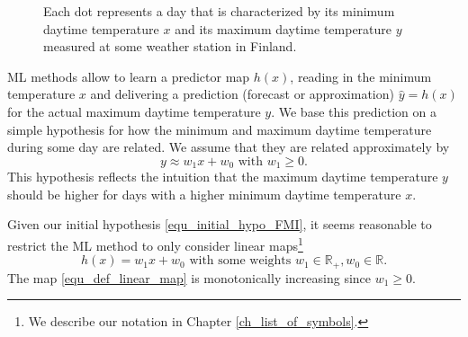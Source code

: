 \documentclass[12pt]{report}
\begin{document}
\begin{figure}[htbp]
	\begin{center}
		\vspace*{-14mm}
	\end{center}
	\caption{Each dot represents a day that is characterized 
		by its minimum daytime temperature $x$ and its maximum 
		daytime temperature $y$ measured at some weather station in 
		Finland.}
	\label{fig_scatterplot_temp_FMI}
	\vspace*{-3mm}
\end{figure}

ML methods allow to learn a predictor map $h(x)$, reading in 
the minimum temperature $x$ and delivering a prediction (forecast or approximation) 
$\hat{y} = h(x)$ for the actual maximum daytime temperature $y$. 
We base this prediction on a simple hypothesis for how the minimum 
and maximum daytime temperature during some day are related. 
We assume that they are related approximately by 
\begin{equation}
\label{equ_initial_hypo_FMI}
y \approx w_{1} x + w_{0} \mbox{ with } w_{1} \geq 0. 
\end{equation}
This hypothesis reflects the intuition that the maximum daytime temperature 
$y$ should be higher for days with a higher minimum daytime temperature $x$. 

Given our initial hypothesis \eqref{equ_initial_hypo_FMI}, it seems reasonable 
to restrict the ML method to only consider linear maps\footnote{We describe our notation in Chapter \ref{ch_list_of_symbols}.}
\begin{equation} 
\label{equ_def_linear_map}
h(x) = w_{1} x + w_{0} \mbox{ with some weights } w_{1} \in \mathbb{R}_{+},w_{0} \in \mathbb{R}. 
\end{equation}
The map \eqref{equ_def_linear_map} is monotonically increasing since $w_{1}\!\geq\!0$. 
\end{document}
